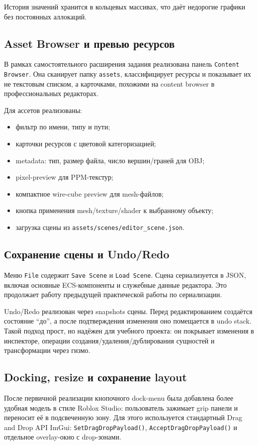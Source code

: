 \documentclass[a4paper,14pt]{extarticle}
\DeclareRobustCommand{\code}[1]{\nolinkurl{#1}}
\begin{document}
История значений хранится в кольцевых массивах, что даёт недорогие графики без постоянных аллокаций.

\subsection{Asset Browser и превью ресурсов}
В рамках самостоятельного расширения задания реализована панель \texttt{Content Browser}. Она сканирует папку \code{assets}, классифицирует ресурсы и показывает их не текстовым списком, а карточками, похожими на content browser в профессиональных редакторах.

Для ассетов реализованы:
\begin{itemize}
  \item фильтр по имени, типу и пути;
  \item карточки ресурсов с цветовой категоризацией;
  \item metadata: тип, размер файла, число вершин/граней для OBJ;
  \item pixel-preview для PPM-текстур;
  \item компактное wire-cube preview для mesh-файлов;
  \item кнопка применения mesh/texture/shader к выбранному объекту;
  \item загрузка сцены из \code{assets/scenes/editor_scene.json}.
\end{itemize}

\subsection{Сохранение сцены и Undo/Redo}
Меню \texttt{File} содержит \texttt{Save Scene} и \texttt{Load Scene}. Сцена сериализуется в JSON, включая основные ECS-компоненты и служебные данные редактора. Это продолжает работу предыдущей практической работы по сериализации.

Undo/Redo реализован через snapshots сцены. Перед редактированием создаётся состояние ``до'', а после подтверждения изменения оно помещается в undo stack. Такой подход прост, но надёжен для учебного проекта: он покрывает изменения в инспекторе, операции создания/удаления/дублирования сущностей и трансформации через гизмо.

\subsection{Docking, resize и сохранение layout}
После первичной реализации кнопочного dock-menu была добавлена более удобная модель в стиле Roblox Studio: пользователь зажимает grip панели и переносит её в подсвеченную зону. Для этого используется стандартный Drag and Drop API ImGui: \code{SetDragDropPayload()}, \code{AcceptDragDropPayload()} и отдельное overlay-окно с drop-зонами.
\end{document}
